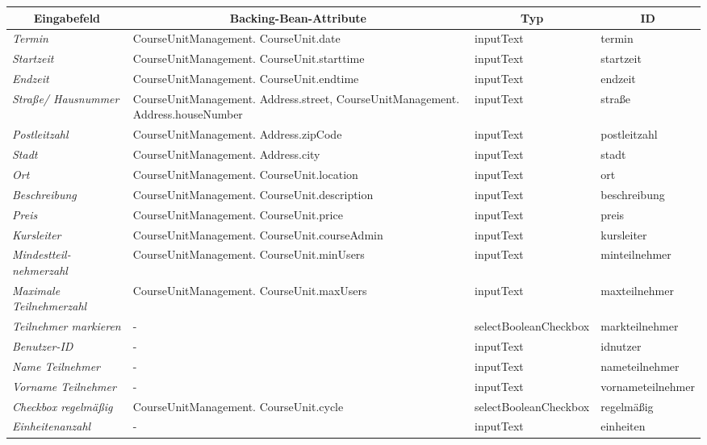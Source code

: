 \begin{itemize}
				\begin{center}
					\begin{longtable}{|p{3cm} |p{5cm} | p{4cm}|p{3cm}|}
						
						\hline \multicolumn{1}{|c|}{\textbf{Eingabefeld}} & \multicolumn{1}{|c|}{\textbf{Backing-Bean-Attribute}} & \multicolumn{1}{|c|}{\textbf{Typ}}  &  \multicolumn{1}{|c|}{\textbf{ID}} \\ \hline
						\endfirsthead
						\hline
						\endlastfoot
						\textit{Termin} & CourseUnitManagement. CourseUnit.date & inputText & termin \\ \hline
						\textit{Startzeit} & CourseUnitManagement. CourseUnit.starttime & inputText & startzeit \\ \hline
						\textit{Endzeit} & CourseUnitManagement. CourseUnit.endtime & inputText & endzeit \\ \hline
						\textit{Straße/ Hausnummer} & CourseUnitManagement. Address.street, CourseUnitManagement. Address.houseNumber & inputText & straße\\ \hline
						\textit{Postleitzahl} & CourseUnitManagement. Address.zipCode & inputText & postleitzahl \\ \hline
						\textit{Stadt} & CourseUnitManagement. Address.city & inputText & stadt \\ \hline
						\textit{Ort} & CourseUnitManagement. CourseUnit.location & inputText & ort \\ \hline
						\textit{Beschreibung} & CourseUnitManagement. CourseUnit.description & inputText & beschreibung\\ \hline
						\textit{Preis} & CourseUnitManagement. CourseUnit.price & inputText & preis \\ \hline
						\textit{Kursleiter} & CourseUnitManagement. CourseUnit.courseAdmin & inputText & kursleiter \\ \hline
						\textit{Mindestteil- nehmerzahl} & CourseUnitManagement. CourseUnit.minUsers & inputText & minteilnehmer \\ \hline
						\textit{Maximale Teilnehmerzahl} & CourseUnitManagement. CourseUnit.maxUsers & inputText & maxteilnehmer \\ \hline
						\textit{Teilnehmer markieren} & - & selectBooleanCheckbox & markteilnehmer \\ \hline
						\textit{Benutzer-ID} & - & inputText & idnutzer \\ \hline
						\textit{Name Teilnehmer} & - & inputText & nameteilnehmer \\ \hline
						\textit{Vorname Teilnehmer} & - & inputText & vornameteilnehmer \\ \hline
						\textit{Checkbox regelmäßig} & CourseUnitManagement. CourseUnit.cycle & selectBooleanCheckbox & regelmäßig \\ \hline
						\textit{Einheitenanzahl} & - & inputText & einheiten \\ \hline
					\end{longtable}
				\end{center}
				

\end{itemize}
